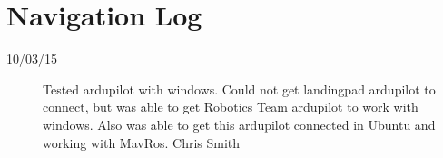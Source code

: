 \section{Navigation Log}

\begin{description}
\item [10/03/15]  Tested ardupilot with windows. Could not get landingpad ardupilot to connect, but was able to get Robotics Team ardupilot to work with windows. Also was able to get this ardupilot connected in Ubuntu and working with MavRos. \hfill{Chris Smith}
\end{description}